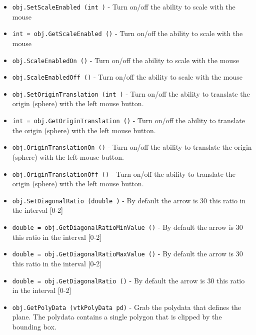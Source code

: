 \begin{itemize}
\item  \verb|obj.SetScaleEnabled (int )| -  Turn on/off the ability to scale with the mouse

\item  \verb|int = obj.GetScaleEnabled ()| -  Turn on/off the ability to scale with the mouse

\item  \verb|obj.ScaleEnabledOn ()| -  Turn on/off the ability to scale with the mouse

\item  \verb|obj.ScaleEnabledOff ()| -  Turn on/off the ability to scale with the mouse

\item  \verb|obj.SetOriginTranslation (int )| -  Turn on/off the ability to translate the origin (sphere)
 with the left mouse button.

\item  \verb|int = obj.GetOriginTranslation ()| -  Turn on/off the ability to translate the origin (sphere)
 with the left mouse button.

\item  \verb|obj.OriginTranslationOn ()| -  Turn on/off the ability to translate the origin (sphere)
 with the left mouse button.

\item  \verb|obj.OriginTranslationOff ()| -  Turn on/off the ability to translate the origin (sphere)
 with the left mouse button.

\item  \verb|obj.SetDiagonalRatio (double )| -  By default the arrow is 30%
 this ratio in the interval [0-2]

\item  \verb|double = obj.GetDiagonalRatioMinValue ()| -  By default the arrow is 30%
 this ratio in the interval [0-2]

\item  \verb|double = obj.GetDiagonalRatioMaxValue ()| -  By default the arrow is 30%
 this ratio in the interval [0-2]

\item  \verb|double = obj.GetDiagonalRatio ()| -  By default the arrow is 30%
 this ratio in the interval [0-2]

\item  \verb|obj.GetPolyData (vtkPolyData pd)| -  Grab the polydata that defines the plane. The polydata contains a single
 polygon that is clipped by the bounding box.


\end{itemize}
